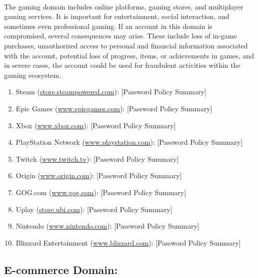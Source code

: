\documentclass{article}
\begin{document}
\paragraph{} The gaming domain includes online platforms, gaming stores, and multiplayer gaming services. It is important for entertainment, social interaction, and sometimes even professional gaming. If an account in this domain is compromised, several consequences may arise. These include loss of in-game purchases, unauthorized access to personal and financial information associated with the account, potential loss of progress, items, or achievements in games, and in severe cases, the account could be used for fraudulent activities within the gaming ecosystem.
\begin{enumerate}
    \item Steam (\url{store.steampowered.com}): [Password Policy Summary]
    \item Epic Games (\url{www.epicgames.com}): [Password Policy Summary]
    \item Xbox (\url{www.xbox.com}): [Password Policy Summary]
    \item PlayStation Network (\url{www.playstation.com}): [Password Policy Summary]
    \item Twitch (\url{www.twitch.tv}): [Password Policy Summary]
    \item Origin (\url{www.origin.com}): [Password Policy Summary]
    \item GOG.com (\url{www.gog.com}): [Password Policy Summary]
    \item Uplay (\url{store.ubi.com}): [Password Policy Summary]
    \item Nintendo (\url{www.nintendo.com}): [Password Policy Summary]
    \item Blizzard Entertainment (\url{www.blizzard.com}): [Password Policy Summary]
\end{enumerate}

\subsection*{E-commerce Domain:}
\end{document}
